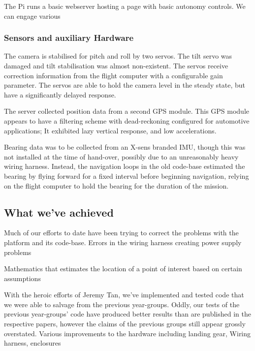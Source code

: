 \documentclass[a4paper, 11pt, titlepage]{article}
\begin{document}
      The Pi runs a basic webserver hosting a page with basic autonomy controls. We can engage various

    \subsubsection{Sensors and auxiliary Hardware}
      The camera is stabilised for pitch and roll by two servos. The tilt servo was damaged and tilt stabilisation was almost non-existent.  The servos receive correction information from the flight computer with a configurable gain parameter.  The servos are able to hold the camera level in the steady state, but have a significantly delayed response.

      The server collected position data from a second GPS module.  This GPS module appears to have a filtering scheme with dead-reckoning configured for automotive applications; It exhibited lazy vertical response, and low accelerations.

      Bearing data was to be collected from an X-sens branded IMU, though this was not installed at the time of hand-over, possibly due to an unreasonably heavy wiring harness.  Instead, the navigation loops in the old code-base estimated the bearing by flying forward for a fixed interval before beginning navigation, relying on the flight computer to hold the bearing for the duration of the mission.

  \subsection{What we've achieved}

    Much of our efforts to date have been trying to correct the problems with the platform and its code-base. %
    Errors in the wiring harness creating power supply problems

    Mathematics that estimates the location of a point of interest based on certain assumptions

    With the heroic efforts of Jeremy Tan, we've implemented and tested code that we were able to salvage from the previous year-groups.  
    Oddly, our tests of the previous year-groups' code have produced better results than are published in the respective papers, however the claims of the previous groups still appear grossly overstated.
    Various improvements to the hardware including landing gear, Wiring harness, enclosures
\end{document}
